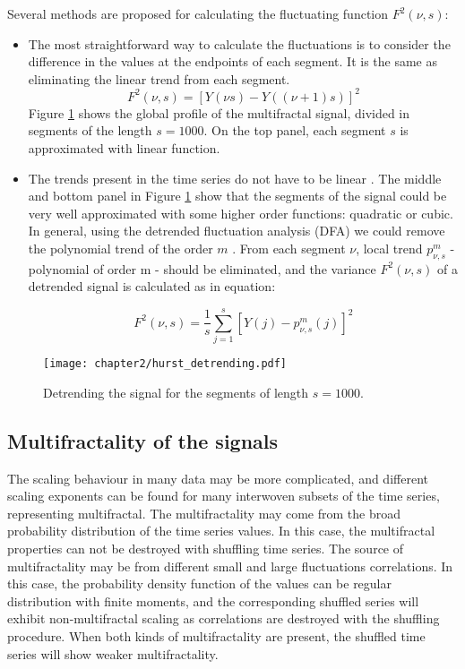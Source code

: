 Several methods are proposed for calculating the fluctuating function $F^2(\nu, s)$:
\begin{itemize}
	\item {The most straightforward way to calculate the fluctuations is to consider the difference in the values at the endpoints of each segment. It is the same as eliminating the linear trend from each segment.  
	$$ F^2(\nu, s) = [Y(\nu s) - Y((\nu +1)s)]^2$$ 
    Figure \ref{fig:hurst_detrending} shows the global profile of the multifractal signal, divided in segments of the length $s=1000$. On the top panel, each segment $s$ is approximated with linear function.
 }
	
	\item The trends present in the time series do not have to be linear \cite{hu2001effect}. The middle and bottom panel in Figure \ref{fig:hurst_detrending} show that the segments of the signal could be very well approximated with some higher order functions: quadratic or cubic. In general, using the detrended fluctuation analysis (DFA) we could remove the polynomial trend of the order $m$ \cite{kantelhardt2001detecting}.  
	From each segment $\nu$, local trend $p^m_{\nu, s}$ - polynomial of order m - should be eliminated, and the variance $F^2(\nu, s)$ of a detrended signal is calculated as in equation:
	
	\begin{equation}
	F^2(\nu, s) = \frac{1}{s}\sum_{j=1}^s \left[Y(j) - p^m_{\nu, s}(j)\right]^2
	\label{eq:var}
	\end{equation}
\end{itemize}
\begin{figure}[h]
	\centering
	\texttt{[image: chapter2/hurst\_detrending.pdf]}
	\caption{Detrending the signal for the segments of length $s=1000$.}
	\label{fig:hurst_detrending}
\end{figure}


\subsection{Multifractality of the signals}

The scaling behaviour in many data may be more complicated, and different scaling exponents can be found for many interwoven subsets of the time series, representing multifractal. The multifractality may come from the broad probability distribution of the time series values. In this case, the multifractal properties can not be destroyed with shuffling time series. The source of multifractality may be from different small and large fluctuations correlations. In this case, the probability density function of the values can be regular distribution with finite moments, and the corresponding shuffled series will exhibit non-multifractal scaling as correlations are destroyed with the shuffling procedure. When both kinds of multifractality are present, the shuffled time series will show weaker multifractality. 

